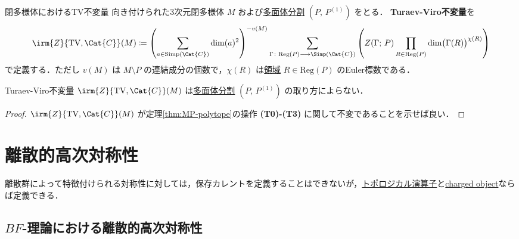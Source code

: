 \documentclass[TQFT_main]{subfiles}
\begin{document}
\begin{mydef}[label=def:TV-closed]{閉多様体におけるTV不変量}
    向き付けられた3次元閉多様体 $M$ および\hyperref[def:polytope-decomp]{多面体分割} $(P,\, P^{(1)})$ をとる．
    \textbf{Turaev-Viro不変量}を
    \begin{align}
        \irm{Z}{\text{TV},\Cat{C}}(M) \coloneqq \left( \sum_{a \in \mathrm{Simp}(\Cat{C})} \dim(a)^2\right)^{-v(M)} \sum_{\Gamma \colon \mathrm{Reg}(P) \lto \Simp(\Cat{C})} \left(Z(\Gamma;\, P) \prod_{R \in \mathrm{Reg}(P)} \dim \bigl( \Gamma(R) \bigr)^{\chi(R)}\right)
    \end{align}
    で定義する．ただし $v(M)$ は $M \setminus P$ の連結成分の個数で，$\chi (R)$ は\hyperref[def:polyhedron]{領域} $R \in \mathrm{Reg}(P)$ のEuler標数である．
\end{mydef}

\begin{mytheo}[label=thm:TV-closed]{}
    Turaev-Viro不変量 $\irm{Z}{\text{TV},\Cat{C}}(M)$ は\hyperref[def:polytope-decomp]{多面体分割} $(P,\, P^{(1)})$ の取り方によらない．
\end{mytheo}

\begin{proof}
    $\irm{Z}{\text{TV},\Cat{C}}(M)$ が定理\ref{thm:MP-polytope}の操作 \textsf{\textbf{(T0)-(T3)}} に関して不変であることを示せば良い．
\end{proof}


\section{離散的高次対称性}

離散群によって特徴付けられる対称性に対しては，保存カレントを定義することはできないが，\hyperref[def:p-form-sym]{トポロジカル演算子}と\hyperref[def:p-form-sym]{charged object}ならば定義できる．

\subsection{$BF$-理論における離散的高次対称性}
\end{document}

